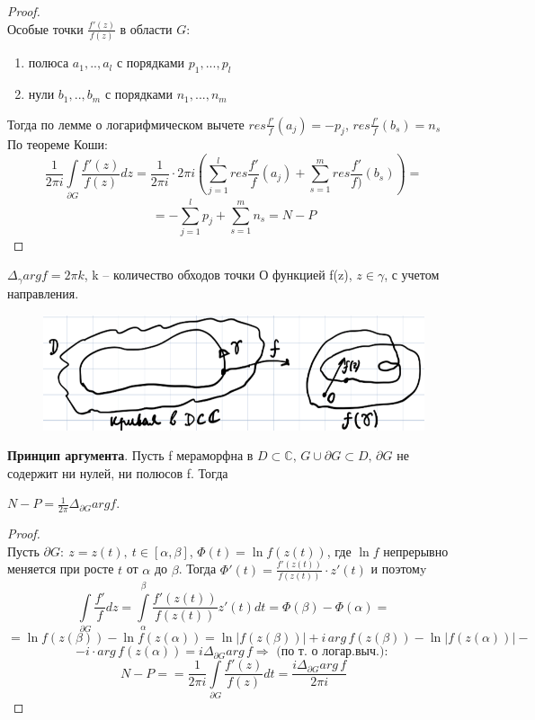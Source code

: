 \begin{proof}
    \ \\
    Особые точки $\frac{f'(z)}{f(z)}$ в области $G$:
    \begin{enumerate}
        \item полюса $a_1, .., a_l$ с порядками $p_1, ..., p_l$
        \item нули $b_1, .., b_m$ с порядками $n_1, ..., n_m$
    \end{enumerate}
    Тогда по лемме о логарифмическом вычете $res\frac{f'}{f}(a_j)=-p_j$, $res\frac{f'}{f}(b_s)=n_s$\\
    По теореме Коши:
    $$\frac{1}{2\pi i}\int\limits_{\partial G} \frac{f'(z)}{f(z)}dz =\frac{1}{2\pi i}\cdot 2\pi i \left(\sum_{j=1}^l res\frac{f'}{f} (a_j) + \sum_{s=1}^m res \frac{f'}{f)}(b_s)\right) =$$
    $$= - \sum_{j=1}^l p_j +\sum_{s=1}^m n_s = N-P$$
\end{proof}


$\Delta_{\gamma}arg f = 2\pi k$, k -- количество обходов точки $О$ функцией f(z), $z \in \gamma$, с учетом направления.

\begin{figure}[h]
    \centering
    \includegraphics[width=0.5\linewidth]{answers/img/image1.png}
    \label{fig:enter-label}
\end{figure}

\textbf{Принцип аргумента}. Пусть f мераморфна в $ D \subset \mathbb{C}, \, G \cup \partial G \subset D, \, \partial G$ не содержит ни нулей, ни полюсов f. Тогда 

$N-P = \frac{1}{2 \pi}\Delta_{\partial G}arg f$.

\begin{proof}
    \ \\
    Пусть $\partial G: \ z=z(t), \ t\in[\alpha, \beta]$,
    $\Phi(t)=\ln f(z(t))$, где $\ln f$ непрерывно меняется при росте $t$ от $\alpha$ до $\beta$. Тогда $\Phi'(t)=\frac{f'(z(t))}{f(z(t))}\cdot z'(t)$ и поэтомy
    $$\int\limits_{\partial G}\frac{f'}{f}dz = \int\limits_{\alpha}^{\beta} \frac{f'(z(t))}{f(z(t))}z'(t)dt=\Phi(\beta) - \Phi(\alpha) = $$
    $$= \ln f(z(\beta))-\ln f(z(\alpha)) = \ln |f(z(\beta))| + i \, arg \, f(z(\beta))-\ln |f(z(\alpha))| -$$
    $$ -i\cdot arg\, f(z(\alpha))=i\Delta_{\partial G}arg \, f \Rightarrow \text{ (по т. о логар.выч.): }$$
    $$N-P==\frac{1}{2\pi i}\int\limits_{\partial G} \frac{f'(z)}{f(z)}dt=\frac{i\Delta_{\partial G}arg\,f}{2\pi i}$$
\end{proof}


